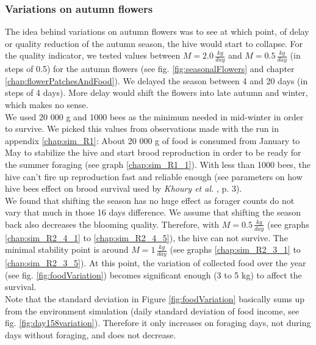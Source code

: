 	\subsubsection{Variations on autumn flowers}
		\label{chap:variationsOnAutumnFlowers}
		The idea behind variations on autumn flowers was to see at which point, of delay or quality reduction of the autumn season, the hive would start to collapse. For the quality indicator, we tested values between $M = 2.0\,\frac{kg}{day}$ and $M = 0.5\,\frac{kg}{day}$ (in steps of 0.5) for the autumn flowers (see fig. \ref{fig:seasonalFlowers} and chapter \ref{chap:flowerPatchesAndFood}). We delayed the season between 4 and 20 days (in steps of 4 days). More delay would shift the flowers into late autumn and winter, which makes no sense.\\
		We used 20 000 g and 1000 bees as the minimum needed in mid-winter in order to survive. We picked this values from observations made with the run in appendix \ref{chap:sim_R1}: About 20 000 g of food is consumed from January to May to stabilize the hive and start brood reproduction in order to be ready for the summer foraging (see graph \ref{chap:sim_R1_1}). With less than 1000 bees, the hive can't fire up reproduction fast and reliable enough (see parameters on how hive bees effect on brood survival used by \textit{Khoury et al.} \cite{khoury13}, p. 3).\\
		We found that shifting the season has no huge effect as forager counts do not vary that much in those 16 days difference. We assume that shifting the season back also decreases the blooming quality. Therefore, with $M = 0.5\,\frac{kg}{day}$ (see graphs \ref{chap:sim_R2_4_1} to \ref{chap:sim_R2_4_5}), the hive can not survive. The minimal stability point is around $M = 1\,\frac{kg}{day}$ (see graphs \ref{chap:sim_R2_3_1} to \ref{chap:sim_R2_3_5}). At this point, the variation of collected food over the year (see fig. \ref{fig:foodVariation}) becomes significant enough (3 to 5 kg) to affect the survival.\\
		
		Note that the standard deviation in Figure \ref{fig:foodVariation} basically sums up from the environment simulation (daily standard deviation of food income, see fig. \ref{fig:day158variation}). Therefore it only increases on foraging days, not during days without foraging, and does not decrease.
		
		
